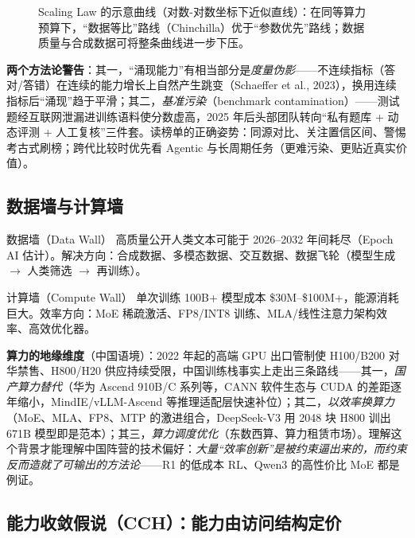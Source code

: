 \documentclass[12pt,a4paper]{article}
\begin{document}
\begin{figure}[htbp]
\centering

\caption{Scaling Law 的示意曲线（对数-对数坐标下近似直线）：在同等算力预算下，“数据等比”路线（Chinchilla）优于“参数优先”路线；数据质量与合成数据可将整条曲线进一步下压。}
\label{fig:scaling}
\end{figure}

\textbf{两个方法论警告}：其一，“涌现能力”有相当部分是\emph{度量伪影}——不连续指标（答对/答错）在连续的能力增长上自然产生跳变（Schaeffer et al., 2023），换用连续指标后“涌现”趋于平滑；其二，\emph{基准污染}（benchmark contamination）——测试题经互联网泄漏进训练语料使分数虚高，2025 年后头部团队转向“私有题库 + 动态评测 + 人工复核”三件套。读榜单的正确姿势：同源对比、关注置信区间、警惕考古式刷榜；跨代比较时优先看 Agentic 与长周期任务（更难污染、更贴近真实价值）。

\subsection{数据墙与计算墙}

\begin{warnbox}{数据墙（Data Wall）}
高质量公开人类文本可能于 2026--2032 年间耗尽（Epoch AI 估计）。解决方向：合成数据、多模态数据、交互数据、数据飞轮（模型生成 $\to$ 人类筛选 $\to$ 再训练）。
\end{warnbox}

\begin{warnbox}{计算墙（Compute Wall）}
单次训练 100B+ 模型成本 \$30M--\$100M+，能源消耗巨大。效率方向：MoE 稀疏激活、FP8/INT8 训练、MLA/线性注意力架构效率、高效优化器。
\end{warnbox}

\textbf{算力的地缘维度}（中国语境）：2022 年起的高端 GPU 出口管制使 H100/B200 对华禁售、H800/H20 供应持续受限，中国训练栈事实上走出三条路线——其一，\emph{国产算力替代}（华为 Ascend 910B/C 系列等，CANN 软件生态与 CUDA 的差距逐年缩小，MindIE/vLLM-Ascend 等推理适配层快速补位）；其二，\emph{以效率换算力}（MoE、MLA、FP8、MTP 的激进组合，DeepSeek-V3 用 2048 块 H800 训出 671B 模型即是范本）；其三，\emph{算力调度优化}（东数西算、算力租赁市场）。理解这个背景才能理解中国阵营的技术偏好：\emph{大量“效率创新”是被约束逼出来的，而约束反而造就了可输出的方法论}——R1 的低成本 RL、Qwen3 的高性价比 MoE 都是例证。

\subsection{能力收敛假说（CCH）：能力由访问结构定价}
\end{document}
